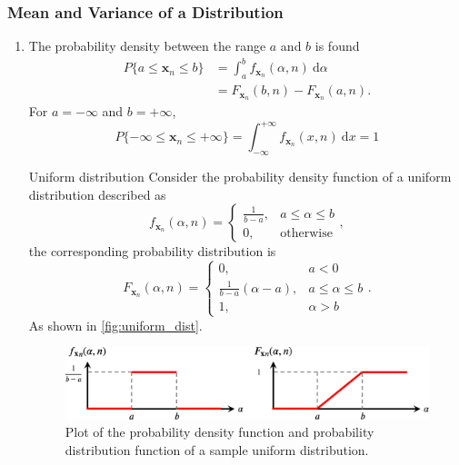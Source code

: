 \subsubsection{Mean and Variance of a Distribution}
\begin{enumerate}
    \item The probability density between the range $a$ and $b$ is found
        \begin{align*}
            P \{a \leq \mathbf{x}_n \leq b \} 
            & = \int_{a}^{b} f_{\mathbf{x}_n} (\alpha, n) \ \mathrm{d} \alpha \\
            & = F_{\mathbf{x}_n}(b, n) - F_{\mathbf{x}_n}(a, n).
        \end{align*}
        For $a = -\infty$ and $b = +\infty$,
        \[
            P \{-\infty \leq \mathbf{x}_n \leq +\infty \} = \int_{-\infty}^{+\infty} f_{\mathbf{x}_n} (x, n) \ \mathrm{d} x = 1
        \]

        \begin{ex}{Uniform distribution}
        \label{ex:uniform_dist}
            Consider the probability density function of a uniform distribution described as
            \[
                f_{\mathbf{x}_n} (\alpha, n) = 
                \begin{cases}
                    \frac{1}{b-a}, & a \leq \alpha \leq b \\
                    0, & \text{otherwise}
                \end{cases}, 
            \]
            the corresponding probability distribution is
            \[
                F_{\mathbf{x}_n} (\alpha, n) = 
                \begin{cases}
                    0, & a < 0 \\
                    \frac{1}{b-a}(\alpha-a), & a \leq \alpha \leq b \\
                    1, & \alpha > b
                \end{cases}.
            \]
            As shown in \autoref{fig:uniform_dist}.
            \begin{figure}[H]
                \centering
                \includegraphics[width=\textwidth]{images/uniform_dist.eps}
                \caption{Plot of the probability density function and probability distribution function of a sample uniform distribution.}
                \label{fig:uniform_dist}
            \end{figure}
        \end{ex}


\end{enumerate}
